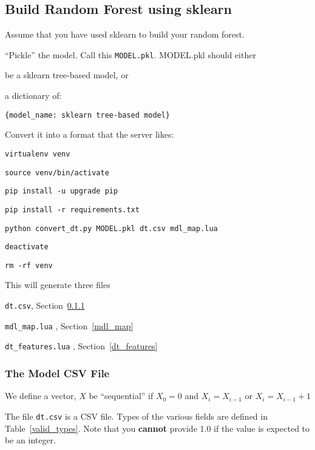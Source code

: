 \subsection{Build Random Forest using sklearn}
Assume that you have used sklearn to build your random forest.
\be
\item ``Pickle'' the model. Call this {\tt MODEL.pkl}.  MODEL.pkl should 
either 
\be
\item be a sklearn tree-based model, or 
\item a dictionary of: \begin{verbatim}
{model_name: sklearn tree-based model}
\end{verbatim}
\ee
\item Convert it into a format that the server likes:
\be
\item \verb+virtualenv venv+
\item \verb+source venv/bin/activate+
\item \verb+pip install -u upgrade pip+
\item \verb+pip install -r requirements.txt+
\item \verb+python convert_dt.py MODEL.pkl dt.csv mdl_map.lua+
\item \verb+deactivate+
\item \verb+rm -rf venv+
\ee
\ee

This will generate three files
\be
\item \verb+dt.csv+, Section~\ref{dt_csv}
\item \verb+mdl_map.lua+ , Section~\ref{mdl_map}
\item \verb+dt_features.lua+ , Section~\ref{dt_features}
\ee

\subsubsection{The Model CSV File}
\label{dt_csv}

\begin{definition}
We define a vector, \(X\) be ``sequential'' if \(X_0 = 0\) and
\(X_i = X_{i-1}\) or \(X_i = X_{i-1}+1\)
\end{definition}

The file \verb+dt.csv+ is a CSV file.
Types of the various fields are defined in Table~\ref{valid_types}. Note that
you {\bf cannot} provide 1.0 if the value is expected to be an integer.

